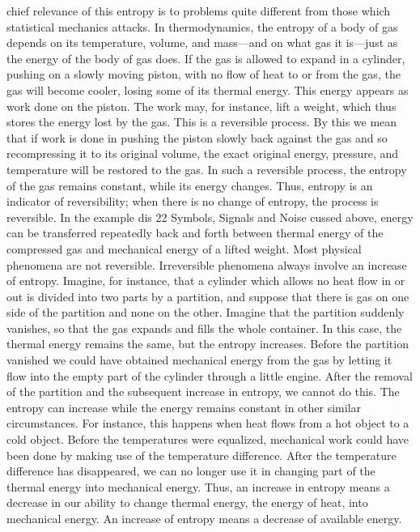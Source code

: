 chief relevance of this entropy is to problems quite different from
those which statistical mechanics attacks.
In thermodynamics, the entropy of a body of gas depends on its
temperature, volume, and mass—and on what gas it is—just as the
energy of the body of gas does. If the gas is allowed to expand in
a cylinder, pushing on a slowly moving piston, with no flow of heat
to or from the gas, the gas will become cooler, losing some of its
thermal energy. This energy appears as work done on the piston.
The work may, for instance, lift a weight, which thus stores the
energy lost by the gas.
This is a reversible process. By this we mean that if work is done
in pushing the piston slowly back against the gas and so recompressing
it to its original volume, the exact original energy, pressure,
and temperature will be restored to the gas. In such a
reversible process, the entropy of the gas remains constant, while
its energy changes.
Thus, entropy is an indicator of reversibility; when there is no
change of entropy, the process is reversible. In the example dis
22
Symbols, Signals and Noise
cussed above, energy can be transferred repeatedly back and forth
between thermal energy of the compressed gas and mechanical
energy of a lifted weight.
Most physical phenomena are not reversible. Irreversible phenomena
always involve an increase of entropy.
Imagine, for instance, that a cylinder which allows no heat flow
in or out is divided into two parts by a partition, and suppose that
there is gas on one side of the partition and none on the other.
Imagine that the partition suddenly vanishes, so that the gas
expands and fills the whole container. In this case, the thermal
energy remains the same, but the entropy increases.
Before the partition vanished we could have obtained mechanical
energy from the gas by letting it flow into the empty part of
the cylinder through a little engine. After the removal of the partition
and the subsequent increase in entropy, we cannot do this.
The entropy can increase while the energy remains constant in
other similar circumstances. For instance, this happens when heat
flows from a hot object to a cold object. Before the temperatures
were equalized, mechanical work could have been done by making
use of the temperature difference. After the temperature difference
has disappeared, we can no longer use it in changing part of the
thermal energy into mechanical energy.
Thus, an increase in entropy means a decrease in our ability to
change thermal energy, the energy of heat, into mechanical energy.
An increase of entropy means a decrease of available energy.
